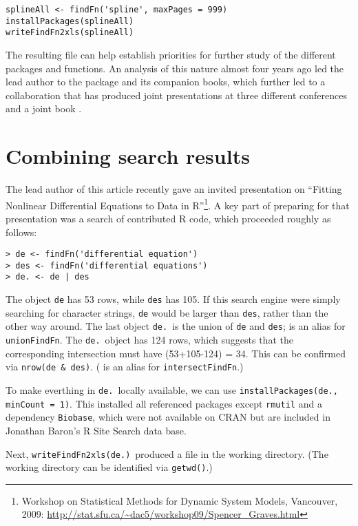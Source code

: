 \begin{verbatim}
splineAll <- findFn('spline', maxPages = 999)
installPackages(splineAll)
writeFindFn2xls(splineAll)
\end{verbatim}

The resulting  file can help establish priorities
for further study of the different packages and functions.  An
analysis of this nature almost four years ago led the lead author
to the  package and its companion books, which further
led to a collaboration that has produced joint presentations at
three different conferences and a joint book \citep{RHG09}.


\section{Combining search results}

The lead author of this article recently gave an invited presentation
on ``Fitting Nonlinear Differential Equations to Data in R''\footnote{Workshop
on Statistical Methods for Dynamic System Models, Vancouver, 2009: \url{http://stat.sfu.ca/~dac5/workshop09/Spencer_Graves.html}}.
A key part of preparing for that presentation was a search of
contributed R code, which proceeded roughly as follows:

\begin{verbatim}
> de <- findFn('differential equation')
> des <- findFn('differential equations')
> de. <- de | des
\end{verbatim}

The object {\tt de} has 53 rows, while {\tt des} has 105.
If this search engine were simply searching for character
strings, {\tt de} would be larger than {\tt des}, rather than
the other way around.  The last object {\tt de.}\ is the union
of {\tt de} and {\tt des};  \samp{|} is an alias for {\tt unionFindFn}.
The {\tt de.}\ object has 124 rows, which suggests that
the corresponding intersection must have (53+105-124) = 34.
This can be confirmed via {\tt nrow(de \& des)}.
(\samp{\&} is an alias for {\tt intersectFindFn}.)

To make everthing in {\tt de.}\ locally available, we can use
{\tt installPackages(de., minCount = 1)}.  This installed all
referenced packages except {\tt rmutil} and a dependency {\tt Biobase},
which were not available on CRAN but are included in Jonathan
Baron's R Site Search data base.

Next, {\tt writeFindFn2xls(de.)}\ produced a file 
in the working directory.  (The working directory can be
identified via {\tt getwd()}.)

